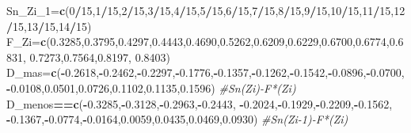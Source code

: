 \documentclass[a4paper,oneside,openany]{book}
\newenvironment{Shaded}{\begin{snugshade}}{\end{snugshade}}
\newcommand{\KeywordTok}[1]{\textcolor[rgb]{0.13,0.29,0.53}{\textbf{#1}}}
\newcommand{\DecValTok}[1]{\textcolor[rgb]{0.00,0.00,0.81}{#1}}
\newcommand{\FloatTok}[1]{\textcolor[rgb]{0.00,0.00,0.81}{#1}}
\newcommand{\CommentTok}[1]{\textcolor[rgb]{0.56,0.35,0.01}{\textit{#1}}}
\newcommand{\OperatorTok}[1]{\textcolor[rgb]{0.81,0.36,0.00}{\textbf{#1}}}
\newcommand{\NormalTok}[1]{#1}
\begin{document}
\begin{Shaded}
\begin{Highlighting}[]
\NormalTok{Sn_Zi_}\DecValTok{1}\NormalTok{=}\KeywordTok{c}\NormalTok{(}\DecValTok{0}\OperatorTok{/}\DecValTok{15}\NormalTok{,}\DecValTok{1}\OperatorTok{/}\DecValTok{15}\NormalTok{,}\DecValTok{2}\OperatorTok{/}\DecValTok{15}\NormalTok{,}\DecValTok{3}\OperatorTok{/}\DecValTok{15}\NormalTok{,}\DecValTok{4}\OperatorTok{/}\DecValTok{15}\NormalTok{,}\DecValTok{5}\OperatorTok{/}\DecValTok{15}\NormalTok{,}\DecValTok{6}\OperatorTok{/}\DecValTok{15}\NormalTok{,}\DecValTok{7}\OperatorTok{/}\DecValTok{15}\NormalTok{,}\DecValTok{8}\OperatorTok{/}\DecValTok{15}\NormalTok{,}\DecValTok{9}\OperatorTok{/}\DecValTok{15}\NormalTok{,}\DecValTok{10}\OperatorTok{/}\DecValTok{15}\NormalTok{,}\DecValTok{11}\OperatorTok{/}\DecValTok{15}\NormalTok{,}\DecValTok{12}\OperatorTok{/}\DecValTok{15}\NormalTok{,}\DecValTok{13}\OperatorTok{/}\DecValTok{15}\NormalTok{,}\DecValTok{14}\OperatorTok{/}\DecValTok{15}\NormalTok{)}
\NormalTok{F_Zi=}\KeywordTok{c}\NormalTok{(}\FloatTok{0.3285}\NormalTok{,}\FloatTok{0.3795}\NormalTok{,}\FloatTok{0.4297}\NormalTok{,}\FloatTok{0.4443}\NormalTok{,}\FloatTok{0.4690}\NormalTok{,}\FloatTok{0.5262}\NormalTok{,}\FloatTok{0.6209}\NormalTok{,}\FloatTok{0.6229}\NormalTok{,}\FloatTok{0.6700}\NormalTok{,}\FloatTok{0.6774}\NormalTok{,}\FloatTok{0.6831}\NormalTok{,}
       \FloatTok{0.7273}\NormalTok{,}\FloatTok{0.7564}\NormalTok{,}\FloatTok{0.8197}\NormalTok{, }\FloatTok{0.8403}\NormalTok{)}
\NormalTok{D_mas=}\KeywordTok{c}\NormalTok{(}\OperatorTok{-}\FloatTok{0.2618}\NormalTok{,}\OperatorTok{-}\FloatTok{0.2462}\NormalTok{,}\OperatorTok{-}\FloatTok{0.2297}\NormalTok{,}\OperatorTok{-}\FloatTok{0.1776}\NormalTok{,}\OperatorTok{-}\FloatTok{0.1357}\NormalTok{,}\OperatorTok{-}\FloatTok{0.1262}\NormalTok{,}\OperatorTok{-}\FloatTok{0.1542}\NormalTok{,}\OperatorTok{-}\FloatTok{0.0896}\NormalTok{,}\OperatorTok{-}\FloatTok{0.0700}\NormalTok{,}
        \OperatorTok{-}\FloatTok{0.0108}\NormalTok{,}\FloatTok{0.0501}\NormalTok{,}\FloatTok{0.0726}\NormalTok{,}\FloatTok{0.1102}\NormalTok{,}\FloatTok{0.1135}\NormalTok{,}\FloatTok{0.1596}\NormalTok{)  }\CommentTok{#Sn(Zi)-F*(Zi)}
\NormalTok{D_menos}\OperatorTok{==}\KeywordTok{c}\NormalTok{(}\OperatorTok{-}\FloatTok{0.3285}\NormalTok{,}\OperatorTok{-}\FloatTok{0.3128}\NormalTok{,}\OperatorTok{-}\FloatTok{0.2963}\NormalTok{,}\OperatorTok{-}\FloatTok{0.2443}\NormalTok{, }\OperatorTok{-}\FloatTok{0.2024}\NormalTok{,}\OperatorTok{-}\FloatTok{0.1929}\NormalTok{,}\OperatorTok{-}\FloatTok{0.2209}\NormalTok{,}\OperatorTok{-}\FloatTok{0.1562}\NormalTok{,}
           \OperatorTok{-}\FloatTok{0.1367}\NormalTok{,}\OperatorTok{-}\FloatTok{0.0774}\NormalTok{,}\OperatorTok{-}\FloatTok{0.0164}\NormalTok{,}\FloatTok{0.0059}\NormalTok{,}\FloatTok{0.0435}\NormalTok{,}\FloatTok{0.0469}\NormalTok{,}\FloatTok{0.0930}\NormalTok{)  }\CommentTok{#Sn(Zi-1)-F*(Zi)}
\end{Highlighting}
\end{Shaded}
\end{document}
